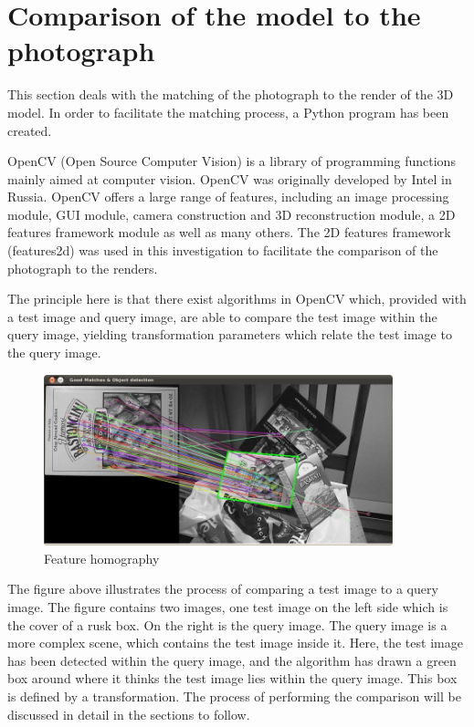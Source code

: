 \documentclass[11pt,a4paper]{report}
\begin{document}
		\section{Comparison of the model to the photograph}
			This section deals with the matching of the photograph to the render of the 3D model. In order to facilitate the matching process, a Python program has been created.
			
			OpenCV (Open Source Computer Vision) is a library of programming functions mainly aimed at computer vision. OpenCV was originally developed by Intel in Russia. OpenCV offers a large range of features, including an image processing module, GUI module, camera construction and 3D reconstruction module, a 2D features framework module as well as many others. The 2D features framework (features2d) was used in this investigation to facilitate the comparison of the photograph to the renders. 
			
			The principle here is that there exist algorithms in OpenCV which, provided with a test image and query image, are able to compare the test image within the query image, yielding transformation parameters which relate the test image to the query image.
			
			\begin{figure}[h!]
				\centering
				\includegraphics[width=0.9\textwidth]{feature_homography_example}
				\caption{Feature homography}
			\end{figure}
			
			The figure above illustrates the process of comparing a test image to a query image. The figure contains two images, one test image on the left side which is the cover of a rusk box. On the right is the query image. The query image is a more complex scene, which contains the test image inside it. Here, the test image has been detected within the query image, and the algorithm has drawn a green box around where it thinks the test image lies within the query image. This box is defined by a transformation. The process of performing the comparison will be discussed in detail in the sections to follow.
			
\end{document}
